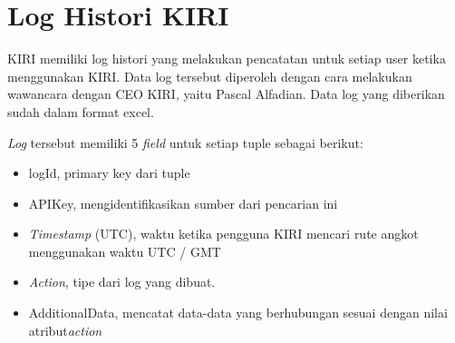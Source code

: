 \section{Log Histori KIRI}

KIRI memiliki log histori yang melakukan pencatatan untuk setiap user ketika menggunakan KIRI. Data log tersebut diperoleh dengan cara melakukan wawancara dengan CEO KIRI, yaitu Pascal Alfadian. Data log yang diberikan sudah dalam format excel.

\textsl{Log} tersebut memiliki 5 \textsl{field} untuk setiap tuple sebagai berikut:
\begin{itemize}
	\item logId, primary key dari tuple
	\item APIKey, mengidentifikasikan sumber dari pencarian ini
	\item \textsl{Timestamp} (UTC), waktu ketika pengguna KIRI mencari rute angkot menggunakan waktu UTC / GMT
	\item \textsl{Action}, tipe dari log yang dibuat.
	\item AdditionalData, mencatat data-data yang berhubungan sesuai dengan nilai atribut\textsl{action}
\end{itemize}

